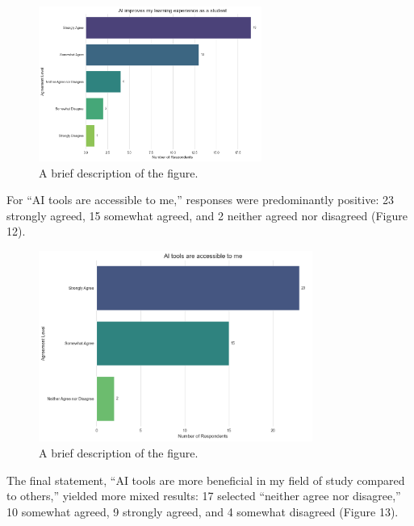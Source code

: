 \documentclass[12pt]{article}
\begin{document}
\begin{figure}[htbp]
  \centering
  \includegraphics[width=0.65\textwidth]{fig7-1.png} %
  \caption{A brief description of the figure.}
  \label{fig:example1}
\end{figure}

For “AI tools are accessible to me,” responses were predominantly positive: 23 strongly agreed, 15 somewhat agreed, and 2 neither agreed nor disagreed (Figure 12).

\begin{figure}[htbp]
  \centering
  \includegraphics[width=0.8\textwidth]{fig7-2.png} %
  \caption{A brief description of the figure.}
  \label{fig:example1}
\end{figure}

The final statement, “AI tools are more beneficial in my field of study compared to others,” yielded more mixed results: 17 selected “neither agree nor disagree,” 10 somewhat agreed, 9 strongly agreed, and 4 somewhat disagreed (Figure 13).
\end{document}
